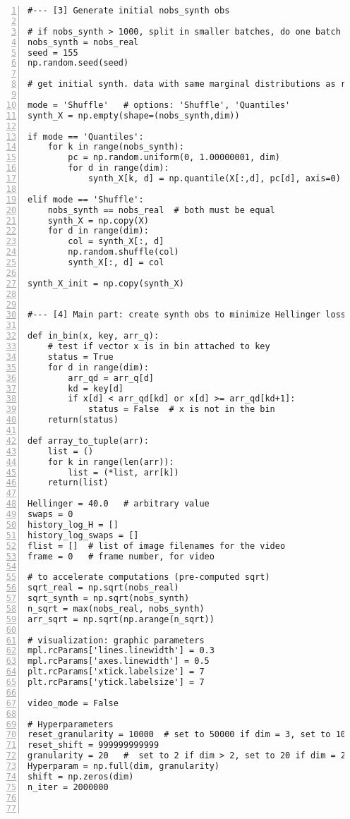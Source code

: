 \documentclass[oneside,10pt]{book}
\begin{document}
\begin{lstlisting}[numbers=left]
#--- [3] Generate initial nobs_synth obs

# if nobs_synth > 1000, split in smaller batches, do one batch at a time
nobs_synth = nobs_real 
seed = 155
np.random.seed(seed)

# get initial synth. data with same marginal distributions as real data 

mode = 'Shuffle'   # options: 'Shuffle', 'Quantiles'
synth_X = np.empty(shape=(nobs_synth,dim))

if mode == 'Quantiles':
    for k in range(nobs_synth):
        pc = np.random.uniform(0, 1.00000001, dim)
        for d in range(dim):
            synth_X[k, d] = np.quantile(X[:,d], pc[d], axis=0)

elif mode == 'Shuffle':
    nobs_synth == nobs_real  # both must be equal
    synth_X = np.copy(X)
    for d in range(dim):
        col = synth_X[:, d]
        np.random.shuffle(col)
        synth_X[:, d] = col

synth_X_init = np.copy(synth_X)


#--- [4] Main part: create synth obs to minimize Hellinger loss function

def in_bin(x, key, arr_q):
    # test if vector x is in bin attached to key
    status = True
    for d in range(dim):
        arr_qd = arr_q[d]
        kd = key[d]
        if x[d] < arr_qd[kd] or x[d] >= arr_qd[kd+1]:
            status = False  # x is not in the bin
    return(status) 

def array_to_tuple(arr):
    list = ()
    for k in range(len(arr)):
        list = (*list, arr[k])
    return(list)

Hellinger = 40.0   # arbitrary value
swaps = 0  
history_log_H = []
history_log_swaps = []
flist = []  # list of image filenames for the video
frame = 0   # frame number, for video

# to accelerate computations (pre-computed sqrt)
sqrt_real = np.sqrt(nobs_real)
sqrt_synth = np.sqrt(nobs_synth)
n_sqrt = max(nobs_real, nobs_synth) 
arr_sqrt = np.sqrt(np.arange(n_sqrt))

# visualization: graphic parameters
mpl.rcParams['lines.linewidth'] = 0.3
mpl.rcParams['axes.linewidth'] = 0.5
plt.rcParams['xtick.labelsize'] = 7
plt.rcParams['ytick.labelsize'] = 7

video_mode = False

# Hyperparameters
reset_granularity = 10000  # set to 50000 if dim = 3, set to 10000 if dim = 2    
reset_shift = 999999999999 
granularity = 20   #  set to 2 if dim > 2, set to 20 if dim = 2 
Hyperparam = np.full(dim, granularity) 
shift = np.zeros(dim)
n_iter = 2000000  



\end{lstlisting}
\end{document}
